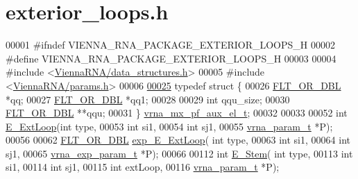 \hypertarget{exterior__loops_8h_source}{}\section{exterior\+\_\+loops.\+h}
\label{exterior__loops_8h_source}

\begin{DoxyCode}
00001 \textcolor{preprocessor}{#ifndef VIENNA\_RNA\_PACKAGE\_EXTERIOR\_LOOPS\_H}
00002 \textcolor{preprocessor}{#define VIENNA\_RNA\_PACKAGE\_EXTERIOR\_LOOPS\_H}
00003 
00004 \textcolor{preprocessor}{#include <\hyperlink{data__structures_8h}{ViennaRNA/data\_structures.h}>}
00005 \textcolor{preprocessor}{#include <\hyperlink{params_8h}{ViennaRNA/params.h}>}
00006 
\hypertarget{exterior__loops_8h_source.tex_l00025}{}\hyperlink{group__loops}{00025} \textcolor{keyword}{typedef} \textcolor{keyword}{struct }\{
00026   \hyperlink{group__data__structures_ga31125aeace516926bf7f251f759b6126}{FLT\_OR\_DBL}  *qq;
00027   \hyperlink{group__data__structures_ga31125aeace516926bf7f251f759b6126}{FLT\_OR\_DBL}  *qq1;
00028 
00029   \textcolor{keywordtype}{int}         qqu\_size;
00030   \hyperlink{group__data__structures_ga31125aeace516926bf7f251f759b6126}{FLT\_OR\_DBL}  **qqu;
00031 \} \hyperlink{group__loops_structvrna__mx__pf__aux__el__t}{vrna\_mx\_pf\_aux\_el\_t};
00032 
00033 
00052 \textcolor{keywordtype}{int} \hyperlink{exterior__loops_8h_a05c6288c5a79d3bd5ad6d33c1bb34bd0}{E\_ExtLoop}(\textcolor{keywordtype}{int} type,
00053               \textcolor{keywordtype}{int} si1,
00054               \textcolor{keywordtype}{int} sj1,
00055               \hyperlink{group__energy__parameters_structvrna__param__s}{vrna\_param\_t} *P);
00056 
00062 \hyperlink{group__data__structures_ga31125aeace516926bf7f251f759b6126}{FLT\_OR\_DBL} \hyperlink{exterior__loops_8h_a446828a191c127861e76e2c84055f672}{exp\_E\_ExtLoop}( \textcolor{keywordtype}{int} type,
00063                       \textcolor{keywordtype}{int} si1,
00064                       \textcolor{keywordtype}{int} sj1,
00065                       \hyperlink{group__energy__parameters_structvrna__exp__param__s}{vrna\_exp\_param\_t} *P);
00066 
00112 \textcolor{keywordtype}{int} \hyperlink{exterior__loops_8h_a51f9851f3500c2aae66674142a6a2dd5}{E\_Stem}( \textcolor{keywordtype}{int} type,
00113             \textcolor{keywordtype}{int} si1,
00114             \textcolor{keywordtype}{int} sj1,
00115             \textcolor{keywordtype}{int} extLoop,
00116             \hyperlink{group__energy__parameters_structvrna__param__s}{vrna\_param\_t} *P);

\end{DoxyCode}
